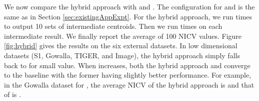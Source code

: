 \begin{comment}
	\begin{center}
	\texttt{[image: figures/vldb/synthe-plugin-true/legend-cropped.eps]}
	\end{center}
	\caption{Effects of the number of dimensions and the number of clusters}\label{fig:synthe}
\end{figure*}



\begin{figure*}[!htb]
	\begin{tabular}{ccc}
	\texttt{[image: figures/vldb/synthe-plugin-true/dplloyd\_med.eps]} & \hspace{-0.5cm}
	\texttt{[image: figures/vldb/synthe-plugin-true/dplloyd\_min.eps]} & \hspace{-0.5cm}
	\texttt{[image: figures/vldb/synthe-plugin-true/eugkm\_nicv.eps]}\\
	\hspace{-0.5cm}(a) DPLloyd-Median & \hspace{-0.5cm}(b) DPLloyd-Best  & \hspace{-0.5cm}(c) EUGkM
	\end{tabular}

	\begin{tabular}{ccc}
	\texttt{[image: figures/vldb/synthe-plugin-true/hybrid\_med.eps]} & \hspace{-0.5cm}
	\texttt{[image: figures/vldb/synthe-plugin-true/pgkm.eps]}  & \hspace{-0.5cm}
	\texttt{[image: figures/vldb/gupt/synthe\_eps\_1.0.eps]}\\
	\hspace{-0.5cm} (d) Hybrid & \hspace{-0.5cm} (e) PGkM & \hspace{-0.5cm} (f) GkM
	\end{tabular}


	\caption{Effects of the number of dimensions and the number of clusters, Heatmap}\label{fig:synthe-heatmap}
\end{figure*}

\end{comment}

We now compare the hybrid approach with \eugkm and \dpl. The configuration for \eugkm and \dpl is the same as in Section \ref{sec:existingAppExpt}.  For the hybrid approach, we run  times to output 10 sets of intermediate centroids.  Then we run  times on each intermediate result.  We finally report the average of 100 NICV values. Figure \ref{fig:hybrid} gives the results on the six external datasets. In low dimensional datasets (S1, Gowalla, TIGER, and Image), the hybrid approach simply falls back to \eugkm for small  value. When  increases, both the hybrid approach and \eugkm converge to the baseline with the former having slightly better performance. For example, in the Gowalla dataset for , the average NICV of the hybrid approach is  and that of \eugkm is .


